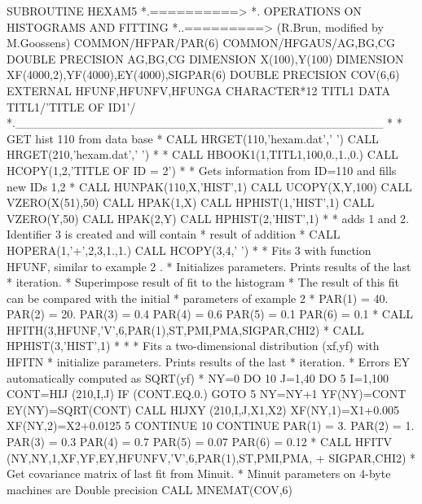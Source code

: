 \begin{XMP}
      SUBROUTINE HEXAM5
*.==========>
*.           OPERATIONS ON HISTOGRAMS AND FITTING
*..=========> (R.Brun, modified by M.Goossens)
      COMMON/HFPAR/PAR(6)
      COMMON/HFGAUS/AG,BG,CG
      DOUBLE PRECISION AG,BG,CG
      DIMENSION X(100),Y(100)
      DIMENSION XF(4000,2),YF(4000),EY(4000),SIGPAR(6)
      DOUBLE PRECISION COV(6,6)
      EXTERNAL HFUNF,HFUNFV,HFUNGA
      CHARACTER*12 TITL1
      DATA TITL1/'TITLE OF ID1'/
*.___________________________________________
*
*             GET hist 110 from data base
*
      CALL HRGET(110,'hexam.dat',' ')
      CALL HRGET(210,'hexam.dat',' ')
*
*
      CALL HBOOK1(1,TITL1,100,0.,1.,0.)
      CALL HCOPY(1,2,'TITLE OF ID = 2')
*
*             Gets information from ID=110 and fills new IDs 1,2
*
      CALL HUNPAK(110,X,'HIST',1)
      CALL UCOPY(X,Y,100)
      CALL VZERO(X(51),50)
      CALL HPAK(1,X)
      CALL HPHIST(1,'HIST',1)
      CALL VZERO(Y,50)
      CALL HPAK(2,Y)
      CALL HPHIST(2,'HIST',1)
*
*             adds 1 and 2. Identifier 3 is created and will contain
*             result of addition
*
      CALL HOPERA(1,'+',2,3,1.,1.)
      CALL HCOPY(3,4,' ')
*
*             Fits 3 with function HFUNF, similar to example 2 .
*             Initializes parameters. Prints results of the last
*             iteration.
*             Superimpose result of fit to the histogram
*             The result of this fit can be compared with the initial
*             parameters of example 2
*
      PAR(1) = 40.
      PAR(2) = 20.
      PAR(3) = 0.4
      PAR(4) = 0.6
      PAR(5) = 0.1
      PAR(6) = 0.1
*
      CALL HFITH(3,HFUNF,'V',6,PAR(1),ST,PMI,PMA,SIGPAR,CHI2)
*
      CALL HPHIST(3,'HIST',1)
*
*
*            Fits a two-dimensional distribution (xf,yf) with HFITN
*            initialize parameters. Prints results of the last
*            iteration.
*            Errors EY automatically computed as SQRT(yf)
*
      NY=0
      DO 10 J=1,40
         DO 5 I=1,100
            CONT=HIJ (210,I,J)
            IF (CONT.EQ.0.) GOTO 5
            NY=NY+1
            YF(NY)=CONT
            EY(NY)=SQRT(CONT)
            CALL HIJXY (210,I,J,X1,X2)
            XF(NY,1)=X1+0.005
            XF(NY,2)=X2+0.0125
    5    CONTINUE
   10 CONTINUE
      PAR(1) = 3.
      PAR(2) = 1.
      PAR(3) = 0.3
      PAR(4) = 0.7
      PAR(5) = 0.07
      PAR(6) = 0.12
*
      CALL HFITV (NY,NY,1,XF,YF,EY,HFUNFV,'V',6,PAR(1),ST,PMI,PMA,
     +            SIGPAR,CHI2)
*       Get covariance matrix of last fit from Minuit.
*       Minuit parameters on 4-byte machines are Double precision 
      CALL MNEMAT(COV,6)

\end{XMP}
